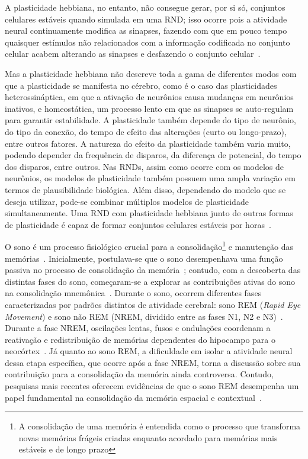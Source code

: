 A plasticidade hebbiana, no entanto, não consegue gerar, por si só, conjuntos celulares estáveis quando simulada em uma RND;\@
isso ocorre pois a atividade neural continuamente modifica as sinapses, fazendo com que em pouco tempo quaisquer estímulos não
relacionados com a informação codificada no conjunto celular acabem alterando as sinapses e desfazendo o conjunto
celular~\cite{gerstnerSpiking2002}.

Mas a plasticidade hebbiana não descreve toda a gama de diferentes modos com que a plasticidade se manifesta no cérebro, como é o
caso das  plasticidades heterossináptica, em que a ativação de neurônios causa mudanças em neurônios inativos, e homeostática, um
processo lento em que as sinapses se auto-regulam para garantir estabilidade. A plasticidade também depende do tipo de neurônio,
do tipo da conexão, do tempo de efeito das alterações (curto ou longo-prazo), entre outros fatores. A natureza do efeito da
plasticidade também varia muito, podendo depender da frequência de disparos, da diferença de potencial, do tempo dos disparos,
entre outros. Nas RNDs, assim como ocorre com os modelos de neurônios, os modelos de plasticidade também possuem uma ampla
variação em termos de plausibilidade biológica. Além disso, dependendo do modelo que se deseja utilizar, pode-se combinar
múltiplos modelos de plasticidade simultaneamente. Uma RND com plasticidade hebbiana junto de outras formas de plasticidade é
capaz de formar conjuntos celulares estáveis por horas~\cite{zenkeDiverse2015}.

O sono é um processo fisiológico crucial para a consolidação\footnote{A consolidação de uma memória é entendida como o processo
que transforma novas memórias frágeis criadas enquanto acordado para memórias mais estáveis e de longo prazo} e manutenção das
memórias~\cite{blissittSleep2001, walkerSleep2006, diekelmannMemory2010}. Inicialmente, postulava-se que o sono desempenhava uma
função passiva no processo de consolidação da memória~\cite{jenkinsObliviscence1924}; contudo, com a descoberta das distintas
fases do sono, começaram-se a explorar as contribuições ativas do sono na consolidação mnemônica~\cite{aserinskyRegularly1953}.
Durante o sono, ocorrem diferentes fases caracterizadas por padrões distintos de atividade cerebral: sono REM (\textit{Rapid Eye
Movement}) e sono não REM (NREM, dividido entre as fases N1, N2 e N3)~\cite{schulzRethinking2008}. Durante a fase NREM, oscilações
lentas, fusos e ondulações coordenam a reativação e redistribuição de memórias dependentes do hipocampo para o
neocórtex~\cite{diekelmannMemory2010}. Já quanto ao sono REM, a dificuldade em isolar a atividade neural dessa etapa específica,
que ocorre após a fase NREM, torna a discussão sobre sua contribuição para a consolidação da memória ainda controversa. Contudo,
pesquisas mais recentes oferecem evidências de que o sono REM desempenha um papel fundamental na consolidação da memória espacial
e contextual~\cite{boyceREM2017}.

